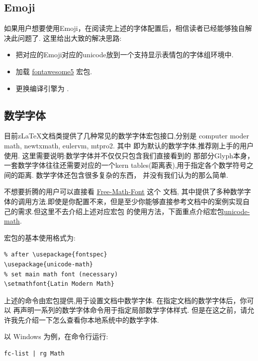 \subsection{Emoji}
如果用户想要使用Emoji，在阅读完上述的字体配置后，相信读者已经能够独自解决此问题了. 这里给出大致的解决思路:
\begin{itemize}
    \item 把对应的Emoji对应的unicode放到一个支持显示表情包的字体组环境中.
    \item 加载 \href{http://mirrors.ctan.org/fonts/fontawesome5/doc/fontawesome5.pdf}{fontawesome5} 宏包.
    \item 更换编译引擎为 .
\end{itemize}


\subsection{数学字体}\label{数学字体}
目前z\LaTeX{}文档类提供了几种常见的数学字体宏包接口,分别是 {computer moder math, newtxmath, eulervm, mtpro2}. 
其中 即为默认的数学字体,推荐刚上手的用户使用. 这里需要说明:数学字体并不仅仅只包含我们直接看到的
那部分Glyph本身，一套数学字体往往还需要对应的一个kern tables(距离表),用于指定各个数学符号之间的距离. 数学字体还包含很多复杂的东西，
并没有我们认为的那么简单.

不想要折腾的用户可以直接看 \href{http://mirrors.ctan.org/info/Free_Math_Font_Survey/en/survey.pdf}{Free-Math-Font} 这个 
文档, 其中提供了多种数学字体的调用方法.即使是你配置不来，但是至少你能够直接参考文档中的案例实现自己的需求.但这里不去介绍上述对应宏包
的使用方法，下面重点介绍宏包\href{http://mirrors.ctan.org/macros/unicodetex/latex/unicode-math/unicode-math.pdf}{unicode-math}. 

宏包的基本使用格式为:
\begin{verbatim}
% after \usepackage{fontspec}
\usepackage{unicode-math}
% set main math font (necessary)
\setmathfont{Latin Modern Math}
\end{verbatim}

上述的命令\cmd{\setmathfont}\index{\cmd{\setmathfont}}由宏包提供,用于设置文档中数学字体. 在指定文档的数学字体后，你可以
再声明一系列的数学字体命令用于指定局部数学字体样式. 但是在这之前，请允许我先介绍一下怎么查看你本地系统中的数学字体. 

以 Windows 为例，在命令行运行:
\begin{verbatim}
fc-list | rg Math
\end{verbatim}

